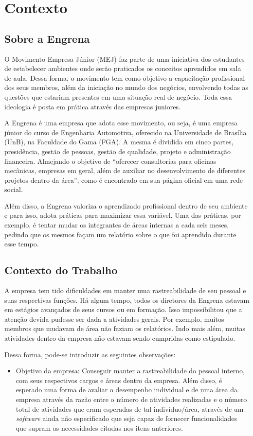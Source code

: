 \chapter{Contexto}
\label{context}

\section{Sobre a Engrena}

O Movimento Empresa Júnior (MEJ) faz parte de uma iniciativa dos estudantes de estabelecer ambientes onde serão praticados os conceitos aprendidos em sala de aula. Dessa forma, o movimento tem como objetivo a capacitação profissional dos seus membros, além da iniciação no mundo dos negócios, envolvendo todas as questões que estariam presentes em uma situação real de negócio. Toda essa ideologia é posta em prática através das empresas juniores.

A Engrena é uma empresa que adota esse movimento, ou seja, é uma empresa júnior do curso de Engenharia Automotiva, oferecido na Universidade de Brasília (UnB), na Faculdade do Gama (FGA). A mesma é dividida em cinco partes, presidência, gestão de pessoas, gestão de qualidade, projeto e administração financeira. Almejando o objetivo de “oferecer consultorias para oficinas mecânicas, empresas em geral, além de auxiliar no desenvolvimento de diferentes projetos dentro da área”, como é encontrado em sua página oficial em uma rede social.

Além disso, a Engrena valoriza o aprendizado profissional dentro de seu ambiente e para isso, adota práticas para maximizar essa variável. Uma das práticas, por exemplo, é tentar mudar os integrantes de áreas internas a cada seis meses, pedindo que os mesmos façam um relatório sobre o que foi aprendido durante esse tempo. 

\section{Contexto do Trabalho}

A empresa tem tido dificuldades em manter uma rastreabilidade de seu pessoal e suas respectivas funções. Há algum tempo, todos os diretores da Engrena estavam em estágios avançados de seus cursos ou em formação. Isso impossibilitou que a atenção devida pudesse ser dada a atividades gerais. Por exemplo, muitos membros que mudavam de área não faziam os relatórios. Indo mais além, muitas atividades dentro da empresa não estavam sendo cumpridas como estipulado.

Dessa forma, pode-se introduzir as seguintes observações:

\begin{itemize}
\item Objetivo da empresa: Conseguir manter a rastreabilidade do pessoal interno, com seus respectivos cargos e áreas dentro da empresa. Além disso, é esperado uma forma de avaliar o desempenho individual e de uma área da empresa através da razão entre o número de atividades realizadas e o número total de atividades que eram esperadas de tal indivíduo/área, através de um \textit{software} ainda não especificado que seja capaz de fornecer funcionalidades que supram as necessidades citadas nos itens anteriores.
\end{itemize}
